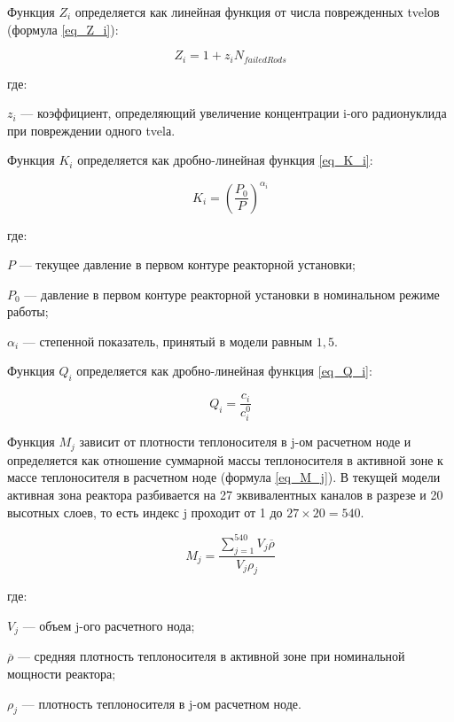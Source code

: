 Функция $Z_{i}$ определяется как линейная функция от числа поврежденных \ac{tvel}ов (формула \ref{eq_Z_i}):

\begin{equation}
    \label{eq_Z_i}
    Z_{i} = 1 + z_{i}N_{failedRods}
\end{equation}

где:
\begin{description}
    \item $z_{i}$ --- коэффициент, определяющий увеличение концентрации  i-ого радионуклида при повреждении одного 
        \ac{tvel}а.
\end{description}

Функция $K_{i}$ определяется как дробно-линейная функция \ref{eq_K_i}:

\begin{equation}
    \label{eq_K_i}
    K_{i} = (\frac{P_{0}}{P})^{\alpha_{i}}
\end{equation}

где:
\begin{description}
    \item $P$ --- текущее давление в первом контуре реакторной установки;
    \item $P_{0}$ --- давление в первом контуре реакторной установки в номинальном режиме работы;
    \item $\alpha_{i}$ --- степенной показатель, принятый в модели равным $1,5$.
\end{description}

Функция $Q_{i}$ определяется как дробно-линейная функция \ref{eq_Q_i}:

\begin{equation}
    \label{eq_Q_i}
    Q_{i} = \frac{c_{i}}{c_{i}^{0}}
\end{equation}

Функция $M_{j}$ зависит от плотности теплоносителя в j-ом расчетном ноде и определяется как отношение суммарной массы 
теплоносителя в активной зоне к массе теплоносителя в расчетном ноде (формула \ref{eq_M_j}). В текущей модели активная 
зона реактора разбивается на 27 эквивалентных каналов в разрезе и 20 высотных слоев, то есть индекс j проходит от 1 до 
$27 \times 20 = 540$.

\begin{equation}
    \label{eq_M_j}
    M_{j} = \frac{\sum_{j=1}^{540} V_{j}\overline{\rho}}{V_{j}\rho_{j}}
\end{equation}

где:
\begin{description}
    \item $V_{j}$ --- объем j-ого расчетного нода;
    \item $\overline{\rho}$ --- средняя плотность теплоносителя в активной зоне при номинальной мощности реактора;
    \item $\rho_{j}$ --- плотность теплоносителя в j-ом расчетном ноде.
\end{description}

